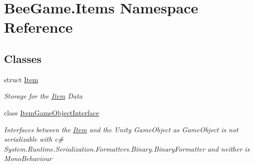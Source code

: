 \hypertarget{namespace_bee_game_1_1_items}{}\section{Bee\+Game.\+Items Namespace Reference}
\label{namespace_bee_game_1_1_items}
\subsection*{Classes}
\begin{DoxyCompactItemize}
\item 
struct \hyperlink{struct_bee_game_1_1_items_1_1_item}{Item}
\begin{DoxyCompactList}\small\item\em Storage for the \hyperlink{struct_bee_game_1_1_items_1_1_item}{Item} Data \end{DoxyCompactList}\item 
class \hyperlink{class_bee_game_1_1_items_1_1_item_game_object_interface}{Item\+Game\+Object\+Interface}
\begin{DoxyCompactList}\small\item\em Interfaces between the \hyperlink{struct_bee_game_1_1_items_1_1_item}{Item} and the Unity Game\+Object as Game\+Object is not serializable with c\# System.\+Runtime.\+Serialization.\+Formatters.\+Binary.\+Binary\+Formatter and neither is Mono\+Behaviour \end{DoxyCompactList}\end{DoxyCompactItemize}
